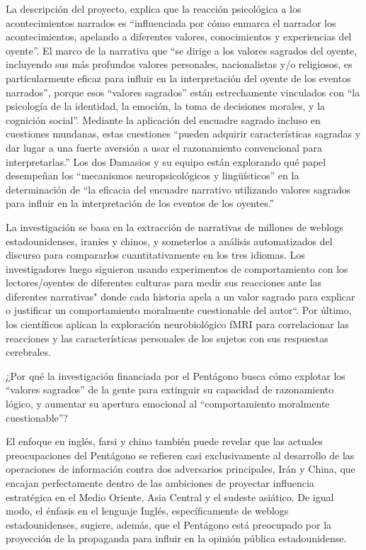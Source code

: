 \documentclass[10pt,a5paper,twoside,spanish,]{book}
\begin{document}
La descripción del proyecto, explica que la reacción psicológica a los
acontecimientos narrados es ``influenciada por cómo enmarca el narrador
los acontecimientos, apelando a diferentes valores, conocimientos y
experiencias del oyente''. El marco de la narrativa que ``se dirige a
los valores sagrados del oyente, incluyendo sus más profundos valores
personales, nacionalistas y/o religiosos, es particularmente eficaz para
influir en la interpretación del oyente de los eventos narrados'',
porque esos ``valores sagrados'' están estrechamente vinculados con ``la
psicología de la identidad, la emoción, la toma de decisiones morales, y
la cognición social''. Mediante la aplicación del encuadre sagrado
incluso en cuestiones mundanas, estas cuestiones ``pueden adquirir
características sagradas y dar lugar a una fuerte aversión a usar el
razonamiento convencional para interpretarlas.'' Los dos Damasios y su
equipo están explorando qué papel desempeñan los ``mecanismos
neuropsicológicos y lingüísticos'' en la determinación de ``la eficacia
del encuadre narrativo utilizando valores sagrados para influir en la
interpretación de los eventos de los oyentes.''

La investigación se basa en la extracción de narrativas de millones de
weblogs estadounidenses, iraníes y chinos, y someterlos a análisis
automatizados del discurso para compararlos cuantitativamente en los
tres idiomas. Los investigadores luego siguieron usando experimentos de
comportamiento con los lectores/oyentes de diferentes culturas para
medir sus reacciones ante las diferentes narrativas" donde cada historia
apela a un valor sagrado para explicar o justificar un comportamiento
moralmente cuestionable del autor``. Por último, los científicos aplican
la exploración neurobiológico fMRI para correlacionar las reacciones y
las características personales de los sujetos con sus respuestas
cerebrales.

¿Por qué la investigación financiada por el Pentágono busca cómo
explotar los ``valores sagrados'' de la gente para extinguir su
capacidad de razonamiento lógico, y aumentar su apertura emocional al
``comportamiento moralmente cuestionable''?

El enfoque en inglés, farsi y chino también puede revelar que las
actuales preocupaciones del Pentágono se refieren casi exclusivamente al
desarrollo de las operaciones de información contra dos adversarios
principales, Irán y China, que encajan perfectamente dentro de las
ambiciones de proyectar influencia estratégica en el Medio Oriente, Asia
Central y el sudeste asiático. De igual modo, el énfasis en el lenguaje
Inglés, específicamente de weblogs estadounidenses, sugiere, además, que
el Pentágono está preocupado por la proyección de la propaganda para
influir en la opinión pública estadounidense.
\end{document}
